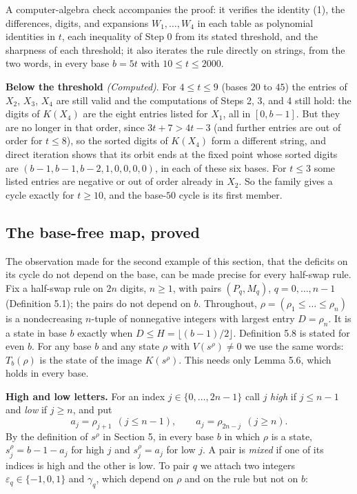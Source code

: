 \documentclass[11pt,letterpaper]{article}
\theoremstyle{paperstyle}
\theoremstyle{paperstyledef}
\theoremstyle{paperstylerem}
\begin{document}
A computer-algebra check accompanies the proof: it verifies the identity (1), the differences, digits, and expansions \(W_1, \dots, W_4\) in each table as polynomial identities in \(t\), each inequality of Step 0 from its stated threshold, and the sharpness of each threshold; it also iterates the rule directly on strings, from the two words, in every base \(b = 5t\) with \(10 \leq t \leq 2000\).

\textbf{Below the threshold} \emph{(Computed)}. For \(4 \leq t \leq 9\) (bases \(20\) to \(45\)) the entries of \(X_2\), \(X_3\), \(X_4\) are still valid and the computations of Steps 2, 3, and 4 still hold: the digits of \(K(X_4)\) are the eight entries listed for \(X_1\), all in \([0, b-1]\). But they are no longer in that order, since \(3t + 7 > 4t - 3\) (and further entries are out of order for \(t \leq 8\)), so the sorted digits of \(K(X_4)\) form a different string, and direct iteration shows that its orbit ends at the fixed point whose sorted digits are \((b-1, b-1, b-2, 1, 0, 0, 0, 0)\), in each of these six bases. For \(t \leq 3\) some listed entries are negative or out of order already in \(X_2\). So the family gives a cycle exactly for \(t \geq 10\), and the base-\(50\) cycle is its first member.

\subsection{The base-free map, proved}\label{the-base-free-map-proved}

The observation made for the second example of this section, that the deficits on its cycle do not depend on the base, can be made precise for every half-swap rule. Fix a half-swap rule on \(2n\) digits, \(n \ge 1\), with pairs \((P_q, M_q)\), \(q = 0, \dots, n-1\) (Definition 5.1); the pairs do not depend on \(b\). Throughout, \(\rho = (\rho_1 \le \dots \le \rho_n)\) is a nondecreasing \(n\)-tuple of nonnegative integers with largest entry \(D = \rho_n\). It is a state in base \(b\) exactly when \(D \le H = \lfloor (b-1)/2 \rfloor\). Definition 5.8 is stated for even \(b\). For any base \(b\) and any state \(\rho\) with \(V(s^\rho) \ne 0\) we use the same words: \(T_b(\rho)\) is the state of the image \(K(s^\rho)\). This needs only Lemma 5.6, which holds in every base.

\textbf{High and low letters.} For an index \(j \in \{0, \dots, 2n-1\}\) call \(j\) \emph{high} if \(j \le n-1\) and \emph{low} if \(j \ge n\), and put \[a_j = \rho_{j+1} \ \ (j \le n-1), \qquad a_j = \rho_{2n-j} \ \ (j \ge n).\] By the definition of \(s^\rho\) in Section 5, in every base \(b\) in which \(\rho\) is a state, \(s^\rho_j = b - 1 - a_j\) for high \(j\) and \(s^\rho_j = a_j\) for low \(j\). A pair is \emph{mixed} if one of its indices is high and the other is low. To pair \(q\) we attach two integers \(\varepsilon_q \in \{-1, 0, 1\}\) and \(\gamma_q\), which depend on \(\rho\) and on the rule but not on \(b\):
\end{document}
